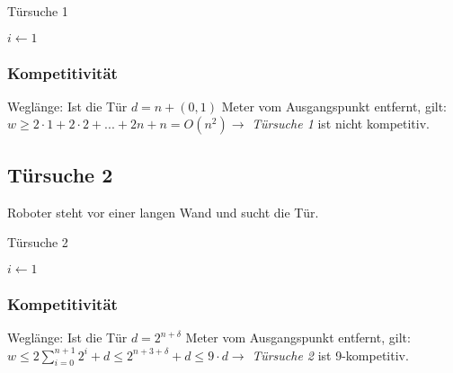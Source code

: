 \begin{algorithm}[H]
	\caption{Türsuche 1}

	$i \longleftarrow 1$
	\BlankLine
	
\end{algorithm}

\subsubsection{Kompetitivität}
Weglänge: Ist die Tür \(d = n + (0,1)\) Meter vom Ausgangspunkt entfernt, gilt:\newline
\(w \geq 2 \cdot 1 + 2 \cdot 2 + ... + 2n +n = O(n^2) \rightarrow\) \textit{Türsuche 1} ist nicht kompetitiv.


\subsection{Türsuche 2}
Roboter steht vor einer langen Wand und sucht die Tür.

\begin{algorithm}[H]
	\caption{Türsuche 2}

	$i \longleftarrow 1$
	\BlankLine
	
\end{algorithm}

\subsubsection{Kompetitivität}
Weglänge: Ist die Tür \(d = 2^{n+\delta}\) Meter vom Ausgangspunkt entfernt, gilt:\newline
\(w \leq 2 \sum\limits_{i=0}^{n+1} 2^i + d \leq 2 ^{n+3+\delta} + d \le 9 \cdot d \rightarrow\) \textit{Türsuche 2} ist 9-kompetitiv.


